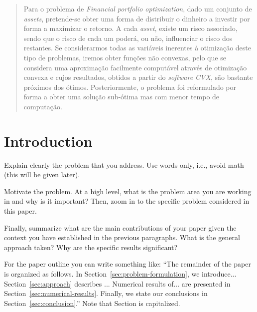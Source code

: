 \documentclass[a4paper]{IEEEtran}
\begin{document}
\maketitle

\begin{abstract}
 Para o problema de \textit{Financial portfolio optimization}, dado um conjunto de \textit{assets}, pretende-se obter uma forma de distribuir o dinheiro a investir por forma a maximizar o retorno. A cada \textit{asset}, existe um risco associado, sendo que o risco de cada um poderá, ou não, influenciar o risco dos restantes.
Se considerarmos todas as variáveis inerentes à otimização deste tipo de problemas, iremos obter funções não convexas, pelo que se considera uma aproximação facilmente computável através de otimização convexa e cujos resultados, obtidos a partir do \textit{software CVX}, são bastante próximos dos ótimos. 
Posteriormente, o problema foi reformulado por forma a obter uma solução sub-ótima mas com menor tempo de computação. 
\end{abstract}

\section{Introduction}
\label{sec:introduction}
Explain clearly the problem that you address. Use words only, i.e., 
avoid math (this will be given later).

Motivate the problem. At a high level, what is the problem
area you are working in and why is it important? Then, zoom in to the
specific problem considered in this paper.

Finally, summarize what are the main contributions of your paper given
the context you have established in the previous paragraphs. What is
the general approach taken? Why are the specific results significant?


For the paper outline you can write something like: ``The remainder of
the paper is organized as follows. In
Section~\ref{sec:problem-formulation}, we
introduce... Section~\ref{sec:approach} describes ... Numerical
results of... are presented in
Section~\ref{sec:numerical-results}. Finally, we state our conclusions
in Section~\ref{sec:conclusion}.'' Note that Section is capitalized.
\end{document}
